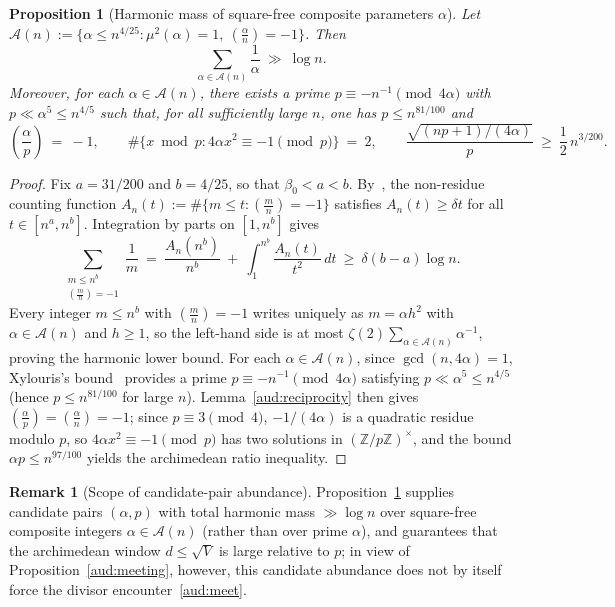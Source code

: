 \documentclass[11pt, a4paper]{article}
\theoremstyle{plain}
\newtheorem{proposition}[theorem]{Proposition}
\theoremstyle{definition}
\newtheorem{remark}[theorem]{Remark}
\newcommand{\Z}{\mathbb{Z}}
\newcommand{\leg}[2]{\left(\frac{#1}{#2}\right)}
\begin{document}
\begin{proposition}[Harmonic mass of square-free composite parameters $\alpha$]\label{aud:harmonic}
Let $\mathcal{A}(n):=\big\{\alpha\le n^{4/25}:\mu^{2}(\alpha)=1,\ \leg{\alpha}{n}=-1\big\}$. Then
\[
\sum_{\alpha\in\mathcal{A}(n)}\frac{1}{\alpha}\ \gg\ \log n.
\]
Moreover, for each $\alpha\in\mathcal{A}(n)$, there exists a prime $p\equiv -n^{-1}\pmod{4\alpha}$ with $p\ll\alpha^{5}\le n^{4/5}$ such that, for all sufficiently large $n$, one has $p\le n^{81/100}$ and
\[
\leg{\alpha}{p}\ =\ -1,\qquad \#\big\{x\bmod p:4\alpha x^{2}\equiv -1\pmod p\big\}\ =\ 2,\qquad \frac{\sqrt{(np+1)/(4\alpha)}}{p}\ \ge\ \frac12\,n^{3/200}.
\]
\end{proposition}
\begin{proof}
Fix $a=31/200$ and $b=4/25$, so that $\beta_0<a<b$. By~\cite{BGHS}, the non-residue counting function $A_n(t):=\#\{m\le t:\leg{m}{n}=-1\}$ satisfies $A_n(t)\ge\delta t$ for all $t\in[n^{a},n^{b}]$. Integration by parts on $[1,n^{b}]$ gives
\[
\sum_{\substack{m\le n^{b}\\ \leg{m}{n}=-1}}\frac{1}{m}\ =\ \frac{A_n(n^{b})}{n^{b}}\ +\ \int_{1}^{n^{b}}\frac{A_n(t)}{t^{2}}\,dt\ \ge\ \delta(b-a)\log n.
\]
Every integer $m\le n^{b}$ with $\leg{m}{n}=-1$ writes uniquely as $m=\alpha h^{2}$ with $\alpha\in\mathcal{A}(n)$ and $h\ge 1$, so the left-hand side is at most $\zeta(2)\sum_{\alpha\in\mathcal{A}(n)}\alpha^{-1}$, proving the harmonic lower bound. For each $\alpha\in\mathcal{A}(n)$, since $\gcd(n,4\alpha)=1$, Xylouris's bound~\cite{xylouris2011} provides a prime $p\equiv -n^{-1}\pmod{4\alpha}$ satisfying $p\ll\alpha^{5}\le n^{4/5}$ (hence $p\le n^{81/100}$ for large $n$). Lemma~\ref{aud:reciprocity} then gives $\leg{\alpha}{p}=\leg{\alpha}{n}=-1$; since $p\equiv 3\pmod 4$, $-1/(4\alpha)$ is a quadratic residue modulo $p$, so $4\alpha x^{2}\equiv -1\pmod p$ has two solutions in $(\Z/p\Z)^{\times}$, and the bound $\alpha p\le n^{97/100}$ yields the archimedean ratio inequality.
\end{proof}

\begin{remark}[Scope of candidate-pair abundance]
Proposition~\ref{aud:harmonic} supplies candidate pairs $(\alpha,p)$ with total harmonic mass $\gg\log n$ over square-free composite integers $\alpha\in\mathcal{A}(n)$ (rather than over prime $\alpha$), and guarantees that the archimedean window $d\le\sqrt{V}$ is large relative to $p$; in view of Proposition~\ref{aud:meeting}, however, this candidate abundance does not by itself force the divisor encounter~\eqref{aud:meet}.
\end{remark}
\end{document}
